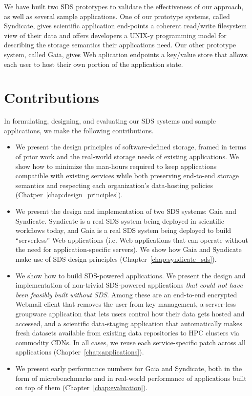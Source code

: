We have built two SDS prototypes to validate the effectiveness of our approach,
as well as several sample applications.  One of our prototype
systems, called Syndicate, gives scientific application end-points a coherent read/write
filesystem view of their data and offers developers a UNIX-y programming model
for describing the storage semantics their applications need.  Our other
prototype system, called Gaia, gives Web aplication endpoints a key/value store
that allows each user to host their own portion of the application state.

\section{Contributions}

In formulating, designing, and evaluating our SDS systems and sample applications,
we make the following contributions.

\begin{itemize}

\item We present the design principles of software-defined storage, framed in
terms of prior work and the real-world storage needs of existing applications.
We show how to minimize the man-hours required to keep applications compatible
with existing services while both preserving end-to-end storage semantics and
respecting each organization's data-hosting policies (Chatper~\ref{chap:design_principles}).

\item We present the design and implementation of two SDS systems: Gaia and
Syndicate.  Syndicate is a real SDS system being deployed in scientific
workflows today, and Gaia is a real SDS system being deployed to build
``serverless'' Web applications (i.e. Web applications that can operate
without the need for application-specific servers).
We show how Gaia and Syndicate make use of SDS design principles
(Chapter~\ref{chap:syndicate_sds}).

\item We show how to build SDS-powered applications.  We present the design and
implementation of non-trivial SDS-powered applications \emph{that could not
have been feasibly built without SDS}.  Among these are an end-to-end encrypted
Webmail client that removes the user from key management, a server-less
groupware application that lets users control how their data gets hosted and
accessed, and a scientific data-staging application that
automatically makes fresh datasets available from existing data repositories to
HPC clusters via commodity CDNs.  In all cases, we reuse each
service-specific patch across all applications
(Chapter~\ref{chap:applications}).

\item We present early performance numbers for Gaia and Syndicate, both in the
form of microbenchmarks and in real-world performance of applications built on
top of them (Chapter~\ref{chap:evaluation}).

\end{itemize}


